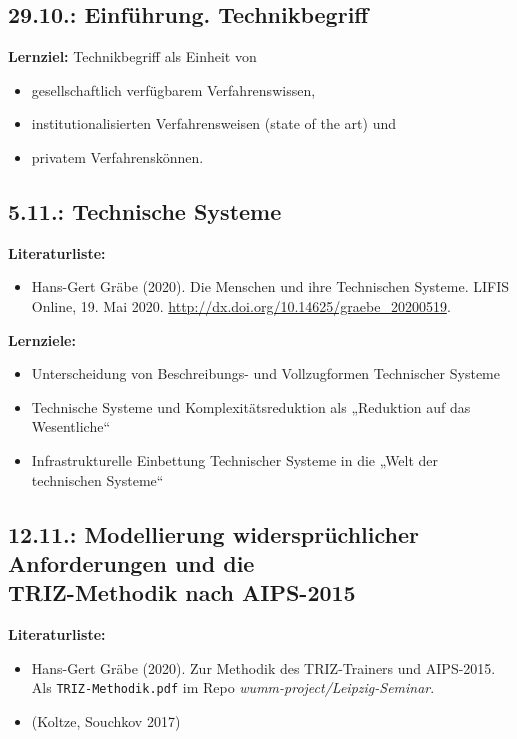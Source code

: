 \documentclass[11pt,a4paper]{article}
\begin{document}
\subsection{29.10.: Einführung. Technikbegriff}

\textbf{Lernziel:}
Technikbegriff als Einheit von 
\begin{itemize}[noitemsep]
\item gesellschaftlich verfügbarem Verfahrenswissen,
\item institutionalisierten Verfahrensweisen (state of the art) und
\item privatem Verfahrenskönnen.
\end{itemize}

\subsection{5.11.: Technische Systeme}

\textbf{Literaturliste:}
\begin{itemize}[noitemsep]
\item Hans-Gert Gräbe (2020). Die Menschen und ihre Technischen Systeme. LIFIS
  Online, 19. Mai 2020. \url{http://dx.doi.org/10.14625/graebe_20200519}.
\end{itemize}

\textbf{Lernziele:}
\begin{itemize}[noitemsep]
\item Unterscheidung von Beschreibungs- und Vollzugformen Technischer Systeme
\item Technische Systeme und Komplexitätsreduktion als „Reduktion auf das
  Wesentliche“
\item Infrastrukturelle Einbettung Technischer Systeme in die „Welt der
  technischen Systeme“
\end{itemize}

\subsection{12.11.: Modellierung widersprüchlicher Anforderungen und die\\
  TRIZ-Methodik nach AIPS-2015}

\textbf{Literaturliste:}
\begin{itemize}[noitemsep]
\item Hans-Gert Gräbe (2020). Zur Methodik des TRIZ-Trainers und AIPS-2015.\\ 
  Als \texttt{TRIZ-Methodik.pdf} im Repo \emph{wumm-project/Leipzig-Seminar}.
\item (Koltze, Souchkov 2017)
\end{itemize}
\end{document}
